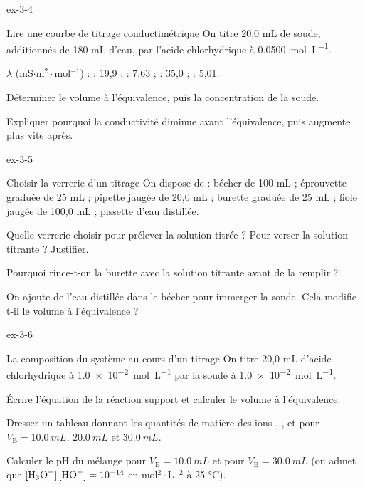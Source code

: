 \begin{blocLivre}{ex-3-4}
\begin{exercice}[1]{Lire une courbe de titrage conductimétrique}
On titre 20,0 mL de soude, additionnés de 180 mL d'eau, par l'acide chlorhydrique à \qty{0,0500}{mol.L^{-1}}.
\begin{donnees}
$\lambda$ (mS$\cdot$m$^2\cdot$mol$^{-1}$) :  : 19,9 ;  : 7,63 ;  : 35,0 ;  : 5,01.
\end{donnees}
\begin{questions}
\item Déterminer le volume à l'équivalence, puis la concentration de la soude.
\item Expliquer pourquoi la conductivité diminue avant l'équivalence, puis augmente plus vite après.
\end{questions}
\end{exercice}
\end{blocLivre}
\begin{blocLivre}{ex-3-5}
\begin{exercice}[1]{Choisir la verrerie d'un titrage}
On dispose de : bécher de 100 mL ; éprouvette graduée de 25 mL ; pipette jaugée de 20,0 mL ; burette graduée de
25 mL ; fiole jaugée de 100,0 mL ; pissette d'eau distillée.
\begin{questions}
\item Quelle verrerie choisir pour prélever la solution titrée ? Pour verser la solution titrante ? Justifier.
\item Pourquoi rince-t-on la burette avec la solution titrante avant de la remplir ?
\item On ajoute de l'eau distillée dans le bécher pour immerger la sonde. Cela modifie-t-il le volume à l'équivalence ?
\end{questions}
\end{exercice}
\end{blocLivre}
\begin{blocLivre}{ex-3-6}
\begin{exercice}[2]{La composition du système au cours d'un titrage}
On titre 20,0 mL d'acide chlorhydrique à \qty{1,0e-2}{mol.L^{-1}} par la soude à \qty{1,0e-2}{mol.L^{-1}}.
\begin{questions}
\item Écrire l'équation de la réaction support et calculer le volume à l'équivalence.
\item Dresser un tableau donnant les quantités de matière des ions , ,  et 
pour $V_\mathrm{B}=\qty{10,0}{mL}$, $\qty{20,0}{mL}$ et $\qty{30,0}{mL}$.
\item Calculer le pH du mélange pour $V_\mathrm{B}=\qty{10,0}{mL}$ et pour $V_\mathrm{B}=\qty{30,0}{mL}$
(on admet que $[\ce{H3O+}]\,[\ce{HO-}]=10^{-14}$ en mol$^2\cdot$L$^{-2}$ à 25 °C).
\end{questions}
\end{exercice}
\end{blocLivre}
